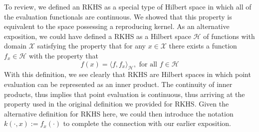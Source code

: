 \documentclass[12pt]{article}
\begin{document}
 To review, we defined an RKHS as a special type of Hilbert space in which all of the evaluation functionals are continuous. We showed that this property is equivalent to the space possessing 
 a reproducing kernel. As an alternative exposition, we could have defined a RKHS as a Hilbert space $\mathcal{H}$ of functions with domain $\mathcal{X}$ 
 satisfying the property that for any $x \in \mathcal{X}$ there exists a function $f_x \in \mathcal{H}$ with the property that 
 \[f(x) = \langle f, f_x \rangle_{\mathcal{H}}, \text{ for all } f \in \mathcal{H} \]
 With this definition, we see clearly that RKHS are Hilbert spaces in which point evaluation can be represented as an inner product. The continuity of inner products, thus implies that point evaluation 
 is continuous, thus arriving at the property used in the original definition we provided for RKHS. Given the alternative definition for RKHS here, we could then introduce the notation 
 $k(\cdot, x) := f_x(\cdot)$ to complete the connection with our earlier exposition. 
 
\end{document}
